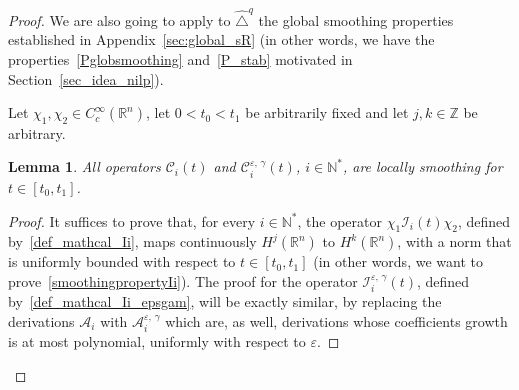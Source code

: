 \documentclass[10pt]{amsart}
\newtheorem{lemm}[theo]{Lemma}\newtheorem{prop}[theo]{Proposition}\newtheorem{coro}[theo]{Corollary}\newtheorem{conj}[theo]{Conjecture}
\theoremstyle{definition}\newtheorem{defi}[theo]{Definition}\newtheorem{rema}[theo]{Remark}\newtheorem{exam}[theo]{Example}\newtheorem{exem}[theo]{Example}\newtheorem{nota}[theo]{Notation}
\newcommand*\R{\mathbb{R}}
\newcommand*\N{\mathbb{N}}
\newcommand*\Z{\mathbb{Z}}
\newcommand{\calA}{\mathcal{A}}
\newcommand{\calC}{\mathcal{C}}
\newcommand{\calI}{\mathcal{I}}
\begin{document}
\begin{proof}
We are also going to apply to $\widehat{\triangle}^{q}$ the global smoothing properties established in Appendix~\ref{sec:global_sR} (in other words, we have the properties~\eqref{Pglobsmoothing} and~\eqref{P_stab} motivated in Section~\ref{sec_idea_nilp}).


Let $\chi_1,\chi_2\in C_c^\infty(\R^n)$, let $0<t_0<t_1$ be arbitrarily fixed and let $j,k\in\Z$ be arbitrary.

\begin{lemm}\label{lem_Ci_locsmoothing}
All operators $\calC_i(t)$ and $\calC_i^{\varepsilon,\,\gamma}(t)$, $i\in\N^*$, are locally smoothing for $t\in[t_0,t_1]$.
\end{lemm}

\goodbreak

\begin{proof}
It suffices to prove that, for every $i\in\N^*$, the operator $\chi_1\calI_i(t)\chi_2$, defined by~\eqref{def_mathcal_Ii}, maps continuously $H^j(\R^n)$ to $H^{k}(\R^n)$, with a norm that is uniformly bounded with respect to $t\in[t_0,t_1]$ (in other words, we want to prove~\eqref{smoothingpropertyIi}). The proof for the operator $\calI_i^{\varepsilon,\,\gamma}(t)$, defined by~\eqref{def_mathcal_Ii_epsgam}, will be exactly similar, by replacing the derivations $\calA_i$ with $\calA_i^{\varepsilon,\,\gamma}$ which are, as well, derivations whose coefficients growth is at most polynomial, uniformly with respect to $\varepsilon$.


\end{proof}
\end{proof}
\end{document}

